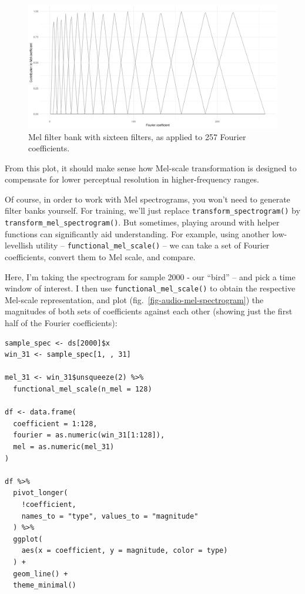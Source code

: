 \documentclass[
  letterpaper,
]{krantz}
\begin{document}
\begin{figure}[H]

{\centering \includegraphics{images/audio-mel-filterbank.png}

}

\caption{\label{fig-audio-mel-filterbank}Mel filter bank with sixteen
filters, as applied to 257 Fourier coefficients.}

\end{figure}

From this plot, it should make sense how Mel-scale transformation is
designed to compensate for lower perceptual resolution in
higher-frequency ranges.

Of course, in order to work with Mel spectrograms, you won't need to
generate filter banks yourself. For training, we'll just replace
\texttt{transform\_spectrogram()} by
\texttt{transform\_mel\_spectrogram()}. But sometimes, playing around
with helper functions can significantly aid understanding. For example,
using another low-levellish utility -- \texttt{functional\_mel\_scale()}
-- we can take a set of Fourier coefficients, convert them to Mel scale,
and compare.

Here, I'm taking the spectrogram for sample 2000 - our ``bird'' -- and
pick a time window of interest. I then use
\texttt{functional\_mel\_scale()} to obtain the respective Mel-scale
representation, and plot (fig.~\ref{fig-audio-mel-spectrogram}) the
magnitudes of both sets of coefficients against each other (showing just
the first half of the Fourier coefficients):

\begin{verbatim}
sample_spec <- ds[2000]$x
win_31 <- sample_spec[1, , 31]

mel_31 <- win_31$unsqueeze(2) %>%
  functional_mel_scale(n_mel = 128)

df <- data.frame(
  coefficient = 1:128,
  fourier = as.numeric(win_31[1:128]),
  mel = as.numeric(mel_31)
)

df %>%
  pivot_longer(
    !coefficient,
    names_to = "type", values_to = "magnitude"
  ) %>%
  ggplot(
    aes(x = coefficient, y = magnitude, color = type)
  ) +
  geom_line() +
  theme_minimal()
\end{verbatim}
\end{document}
